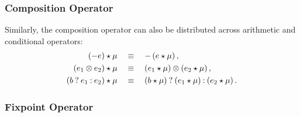 \subsubsection{Composition Operator}

Similarly, the composition operator can also be distributed across arithmetic
and conditional operators:
\begin{equation}
    \begin{aligned}
        \left( -e \right) \expand \mu
        & \quad \eqrel \quad
        -\left( e \expand \mu \right), \\
        \left( e_1 \opsymbol e_2 \right) \expand \mu
        & \quad \eqrel \quad
        \left( e_1 \expand \mu \right) \opsymbol
        \left( e_2 \expand \mu \right), \\
        \left( \select{b}{e_1}{e_2} \right) \expand \mu
        & \quad \eqrel \quad
        \select{%
            \left( b \expand \mu \right)}{%
            \left( e_1 \expand \mu \right)}{%
            \left( e_2 \expand \mu \right)}.
    \end{aligned}
\end{equation}

\subsubsection{Fixpoint Operator}


